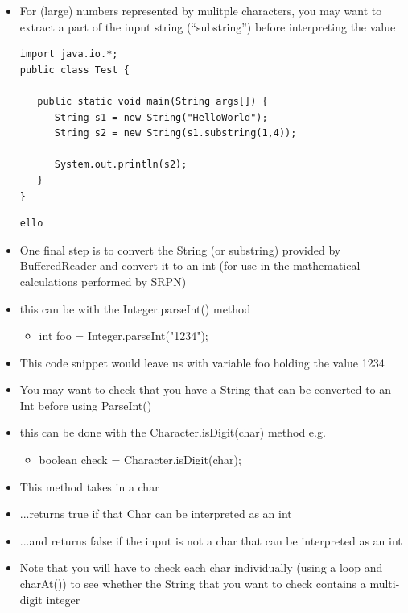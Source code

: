\documentclass{beamer}
\begin{document}
\begin{frame}[fragile]
\begin{itemize}
\item For (large) numbers represented by mulitple characters, you may want to extract a part of the input string (``substring'') before interpreting the value
\begin{block}{}
\begin{lstlisting}
import java.io.*;
public class Test {

   public static void main(String args[]) {
      String s1 = new String("HelloWorld");
      String s2 = new String(s1.substring(1,4));

      System.out.println(s2);
   }
}
\end{lstlisting}
\end{block}
\begin{block}{}
\begin{lstlisting}
ello
\end{lstlisting}
\end{block}
\end{itemize}
\end{frame}


\begin{frame}
\begin{itemize}
\item One final step is to convert the String (or substring) provided by BufferedReader and convert it to an int (for use in the mathematical calculations performed by SRPN)
\item this can be with the Integer.parseInt() method
\begin{itemize}
\item int foo = Integer.parseInt("1234");
\end{itemize}
\item This code snippet would leave us with variable foo holding the value 1234
\end{itemize}
\end{frame}


\begin{frame}
\begin{itemize}
\item You may want to check that you have a String that can be converted to an Int before using ParseInt()
\item this can be done with the Character.isDigit(char) method e.g.
\begin{itemize}
\item boolean check = Character.isDigit(char); 
\end{itemize}
\item This method takes in a char
\item ...returns true if that Char can be interpreted as an int
\item ...and returns false if the input is not a char that can be interpreted as an int
\item Note that you will have to check each char individually (using a loop and charAt()) to see whether the String that you want to check contains a multi-digit integer
\end{itemize}
\end{frame}
\end{document}
